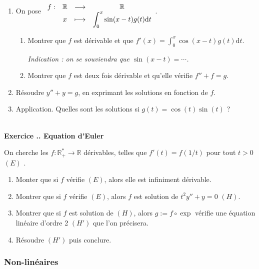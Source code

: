 \documentclass{article}
\newcommand{\fonction}[5]{\raisebox{-0.5\baselineskip}{$\begin{array}{lccc}
    #1: & #2 & \longrightarrow & #3 \\
        & #4 & \longmapsto & #5 \end{array}$}}
\newcommand{\di}{\mathrm{d}}
\newcommand{\mb}[1]{\mathbb{#1}}
\newcounter{exo}
\newcommand{\exercice}[1][\null]{\textbf{\\ Exercice \thesection.\theexo. #1} \addtocounter{exo}{1}}
\begin{document}
\begin{enumerate}

\item  On pose $\fonction{f}{\mb{R}}{\mb{R}}{x}{\displaystyle \int_0^x \sin(x-t) g(t) \di t}$.

\begin{enumerate}
\item Montrer que $f$ est dérivable et que $f'(x) =  \displaystyle \int_0^x \cos(x-t) g(t) \di t$.

\emph{Indication : on se souviendra que $\sin(x-t) = \cdots$.}

\item Montrer que $f$ est deux fois dérivable et qu'elle vérifie $f'' + f = g$.


\end{enumerate}

\item Résoudre $y'' + y = g$, en exprimant les solutions en fonction de $f$.

\item Application. Quelles sont les solutions si $g(t) = \cos(t) \sin(t)$ ? 

\end{enumerate}


\exercice[Equation d'Euler]

On cherche les $f : \mb{R}_+^* \rightarrow \mb{R}$ dérivables, telles que $f'(t) = f(1/t)$ pour tout $t>0$ $(E)$ .

\begin{enumerate}

\item Monter que si $f$ vérifie $(E)$, alors elle est infiniment dérivable.

\item Montrer que si $f$ vérifie $(E)$, alors $f$ est solution de $t^2 y'' + y = 0$ $(H)$.

\item Montrer que si $f$ est solution de $(H)$, alors $g := f \circ \exp$ vérifie une équation linéaire d'ordre 2 $(H')$ que l'on précisera.

\item Résoudre $(H')$ puis conclure.

\end{enumerate}

\subsubsection{Non-linéaires}
\end{document}
